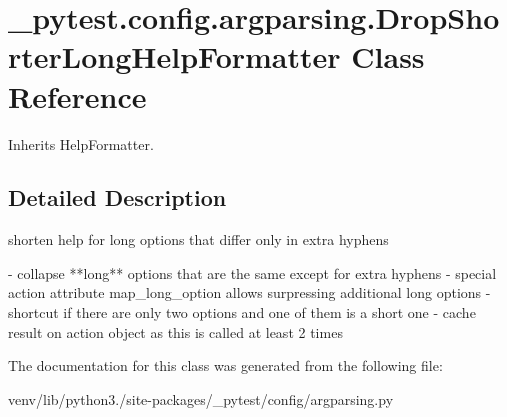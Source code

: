 \hypertarget{class__pytest_1_1config_1_1argparsing_1_1_drop_shorter_long_help_formatter}{}\section{\+\_\+pytest.\+config.\+argparsing.\+Drop\+Shorter\+Long\+Help\+Formatter Class Reference}
\label{class__pytest_1_1config_1_1argparsing_1_1_drop_shorter_long_help_formatter}


Inherits Help\+Formatter.



\subsection{Detailed Description}
\begin{DoxyVerb}shorten help for long options that differ only in extra hyphens

- collapse **long** options that are the same except for extra hyphens
- special action attribute map_long_option allows surpressing additional
  long options
- shortcut if there are only two options and one of them is a short one
- cache result on action object as this is called at least 2 times
\end{DoxyVerb}
 

The documentation for this class was generated from the following file\+:\begin{DoxyCompactItemize}
\item 
venv/lib/python3./site-\/packages/\+\_\+pytest/config/argparsing.\+py\end{DoxyCompactItemize}
